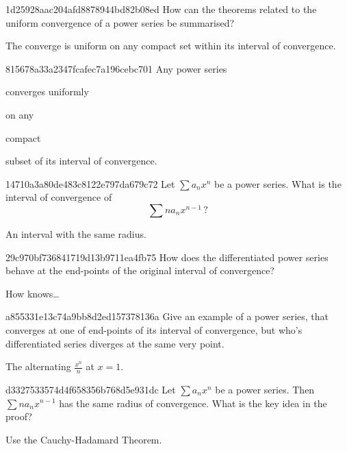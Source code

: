 \begin{note}{1d25928aac204afd8878944bd82b08ed}
    How can the theorems related to the uniform convergence of a power series be summarised?

    \begin{cloze}{1}
        The converge is uniform on any compact set within its interval of convergence.
    \end{cloze}
\end{note}

\begin{note}{815678a33a2347fcafec7a196cebc701}
    Any power series \begin{icloze}{1}converges uniformly\end{icloze} on any \begin{icloze}{2}compact\end{icloze} subset of its interval of convergence.
\end{note}

\begin{note}{14710a3a80de483c8122e797da679c72}
    Let \({ \sum a_n x^{n} }\) be a power series.
    What is the interval of convergence of
    \[
        \sum n a_n x^{n-1}\,?
    \]

    \begin{cloze}{1}
        An interval with the same radius.
    \end{cloze}
\end{note}

\begin{note}{29c970bf736841719d13b9711ea4fb75}
    How does the dif\-fer\-en\-ti\-ated power series behave at the end-points of the original interval of convergence?

    \begin{cloze}{1}
        How knows\ldots
    \end{cloze}
\end{note}

\begin{note}{a855331e13c74a9bb8d2ed157378136a}
    Give an example of a power series, that converges at one of end-points of its interval of convergence, but who's dif\-fer\-en\-ti\-ated series diverges at the same very point.

    \begin{cloze}{1}
        The alternating \({ \frac{x^{n}}{n} }\) at \({ x = 1 }\).
    \end{cloze}
\end{note}

\begin{note}{d3327533574d4f658356b768d5e931dc}
    Let \({ \sum a_n x^{n} }\) be a power series.
    Then \({ \sum n a_n x^{n-1} }\) has the same radius of convergence.
    What is the key idea in the proof?

    \begin{cloze}{1}
        Use the Cauchy-Hadamard Theorem.
    \end{cloze}
\end{note}

